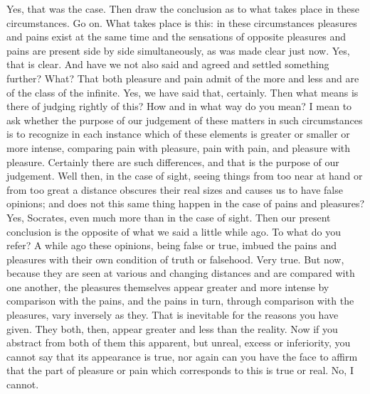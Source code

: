 \documentclass[letterpaper,12pt]{article}
\newcommand{\stephpag}[1]{\marginnote{\small\itshape\fontfamily{ppl}\selectfont #1}}
\begin{document}
\begin{drama}
\protarchusspeaks
Yes, that was the case.
\socratesspeaks
Then draw the conclusion as to what takes place in these circumstances.
\protarchusspeaks
Go on. \stephpag{d}
\socratesspeaks
What takes place is this: in these circumstances pleasures and pains exist at the same time and the sensations of opposite pleasures and pains are present side by side simultaneously, as was made clear just now.
\protarchusspeaks
Yes, that is clear.
\socratesspeaks
And have we not also said and agreed and settled something further?
\protarchusspeaks
What?
\socratesspeaks
That both pleasure and pain admit of the more and less and are of the class of the infinite.
\protarchusspeaks
Yes, we have said that, certainly.
\socratesspeaks
Then what means is there of judging rightly of this? \stephpag{e}
\protarchusspeaks
How and in what way do you mean?
\socratesspeaks
I mean to ask whether the purpose of our judgement of these matters in such circumstances is to recognize in each instance which of these elements is greater or smaller or more intense, comparing pain with pleasure, pain with pain, and pleasure with pleasure.
\protarchusspeaks
Certainly there are such differences, and that is the purpose of our judgement.
\socratesspeaks
Well then, in the case of sight, seeing things from too near at hand or from too great a distance \stephpag{42 a} obscures their real sizes and causes us to have false opinions; and does not this same thing happen in the case of pains and pleasures?
\protarchusspeaks
Yes, Socrates, even much more than in the case of sight.
\socratesspeaks
Then our present conclusion is the opposite of what we said a little while ago.
\protarchusspeaks
To what do you refer?
\socratesspeaks
A while ago these opinions, being false or true, imbued the pains and pleasures with their own condition of truth or falsehood. \stephpag{b}
\protarchusspeaks
Very true.
\socratesspeaks
But now, because they are seen at various and changing distances and are compared with one another, the pleasures themselves appear greater and more intense by comparison with the pains, and the pains in turn, through comparison with the pleasures, vary inversely as they.
\protarchusspeaks
That is inevitable for the reasons you have given.
\socratesspeaks
They both, then, appear greater and less than the reality. Now if you abstract from both of them this apparent, but unreal, excess or inferiority, you cannot say that its appearance is true, \stephpag{c} nor again can you have the face to affirm that the part of pleasure or pain which corresponds to this is true or real.
\protarchusspeaks
No, I cannot.

\end{drama}
\end{document}
